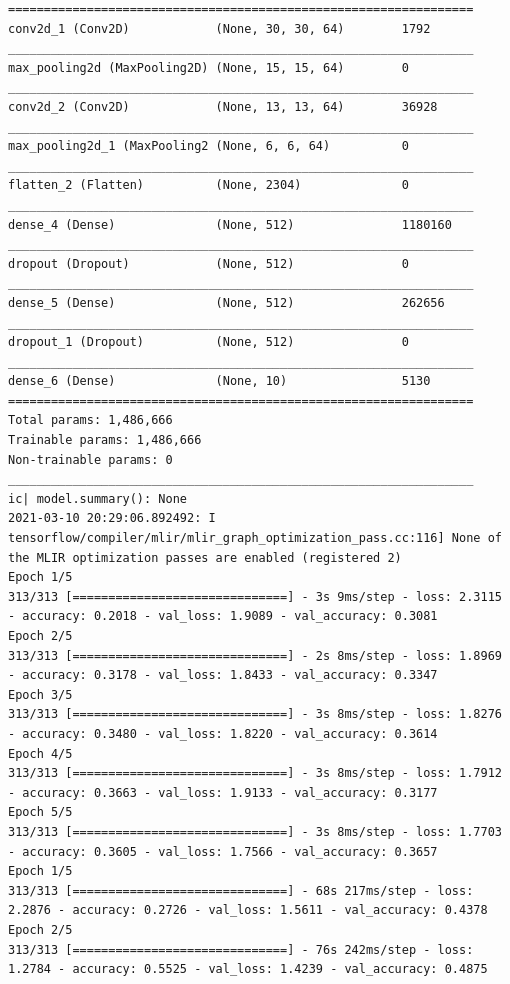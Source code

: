 \documentclass{tron}
\begin{document}
\begin{lstlisting}[style=mystyle:output]
=================================================================
conv2d_1 (Conv2D)            (None, 30, 30, 64)        1792
_________________________________________________________________
max_pooling2d (MaxPooling2D) (None, 15, 15, 64)        0
_________________________________________________________________
conv2d_2 (Conv2D)            (None, 13, 13, 64)        36928
_________________________________________________________________
max_pooling2d_1 (MaxPooling2 (None, 6, 6, 64)          0
_________________________________________________________________
flatten_2 (Flatten)          (None, 2304)              0
_________________________________________________________________
dense_4 (Dense)              (None, 512)               1180160
_________________________________________________________________
dropout (Dropout)            (None, 512)               0
_________________________________________________________________
dense_5 (Dense)              (None, 512)               262656
_________________________________________________________________
dropout_1 (Dropout)          (None, 512)               0
_________________________________________________________________
dense_6 (Dense)              (None, 10)                5130
=================================================================
Total params: 1,486,666
Trainable params: 1,486,666
Non-trainable params: 0
_________________________________________________________________
ic| model.summary(): None
2021-03-10 20:29:06.892492: I tensorflow/compiler/mlir/mlir_graph_optimization_pass.cc:116] None of the MLIR optimization passes are enabled (registered 2)
Epoch 1/5
313/313 [==============================] - 3s 9ms/step - loss: 2.3115 - accuracy: 0.2018 - val_loss: 1.9089 - val_accuracy: 0.3081
Epoch 2/5
313/313 [==============================] - 2s 8ms/step - loss: 1.8969 - accuracy: 0.3178 - val_loss: 1.8433 - val_accuracy: 0.3347
Epoch 3/5
313/313 [==============================] - 3s 8ms/step - loss: 1.8276 - accuracy: 0.3480 - val_loss: 1.8220 - val_accuracy: 0.3614
Epoch 4/5
313/313 [==============================] - 3s 8ms/step - loss: 1.7912 - accuracy: 0.3663 - val_loss: 1.9133 - val_accuracy: 0.3177
Epoch 5/5
313/313 [==============================] - 3s 8ms/step - loss: 1.7703 - accuracy: 0.3605 - val_loss: 1.7566 - val_accuracy: 0.3657
Epoch 1/5
313/313 [==============================] - 68s 217ms/step - loss: 2.2876 - accuracy: 0.2726 - val_loss: 1.5611 - val_accuracy: 0.4378
Epoch 2/5
313/313 [==============================] - 76s 242ms/step - loss: 1.2784 - accuracy: 0.5525 - val_loss: 1.4239 - val_accuracy: 0.4875

\end{lstlisting}
\end{document}

